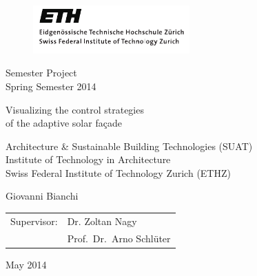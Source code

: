\documentclass[12pt, a4paper]{article}
\begin{document}
\sffamily

\begin{figure}
\includegraphics[width=60mm]{ethlogo}
\end{figure}

\vspace*{0.0ex}

\LARGE
\begin{center}
  Semester Project\\
  Spring Semester 2014\\
\end{center}
\normalsize

\vspace*{5.0ex}

\bfseries
\Huge
\begin{center}

Visualizing the control strategies\\
of the adaptive solar fa\c{c}ade\\

\end{center}
\normalsize

\vspace*{5.0ex}
\mdseries
\begin{center}
  Architecture \& Sustainable Building Technologies (SUAT)\\
  Institute of Technology in Architecture\\
  Swiss Federal Institute of Technology Zurich (ETHZ)\\
\end{center}

\vspace*{5.0ex}

\LARGE
\begin{center}
  Giovanni Bianchi
\end{center}
\normalsize

\vfill

\large
\begin{tabular}[b]{ll}
  Supervisor:
  & Dr. Zoltan Nagy \\
  & Prof.\ Dr.\ Arno Schl\"{u}ter
\end{tabular}
\hfill May 2014
\end{document}
